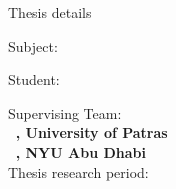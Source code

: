\pagestyle{empty}
\begin{center}

{\LARGE Thesis details\\[1cm]}

Subject: {\large \textbf{ \thesistitle }\\[1cm]}

Student: {\large \textbf{ \me }\\[1cm]}

Supervising Team:\\
\textbf{\large \suptitle \, \supname , University of Patras} \\
\textbf{\large \cosuptitle \, \cosupname , NYU Abu Dhabi} \\[1cm]

Thesis research period:


\end{center}